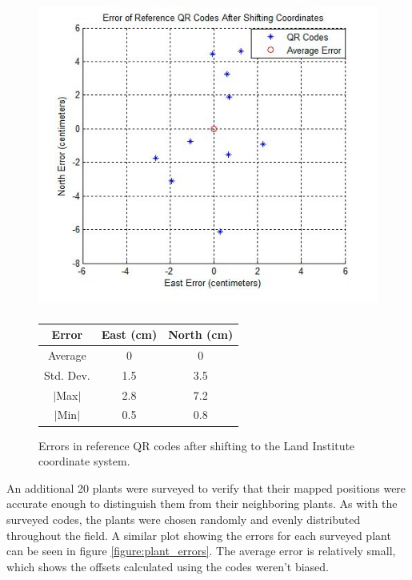   \begin{figure}
	\centering
    \includegraphics[height=4in]{figures/code_errors.jpg}
    \label{figure:code_errors}
    \newline
    \newline
    \centering
    \begin{tabular}[c]{|c|c|c|}
       \hline
        Error & East (cm) & North (cm) \\ 
        \hline
        Average   & 0 & 0             \\
        Std. Dev. & 1.5 & 3.5         \\
        $|$Max$|$   & 2.8 & 7.2       \\
        $|$Min$|$   & 0.5 & 0.8       \\
        \hline
    \end{tabular}
    \captionsetup{labelformat=andtable}
    \caption{Errors in reference QR codes after shifting to the Land Institute coordinate system.}
  \end{figure}

An additional 20 plants were surveyed to verify that their mapped positions were accurate enough to distinguish them from their neighboring plants.  As with the surveyed codes, the plants were chosen randomly and evenly distributed throughout the field.   A similar plot showing the errors for each surveyed plant can be seen in figure \ref{figure:plant_errors}.  The average error is relatively small, which shows the offsets calculated using the codes weren't biased.   

